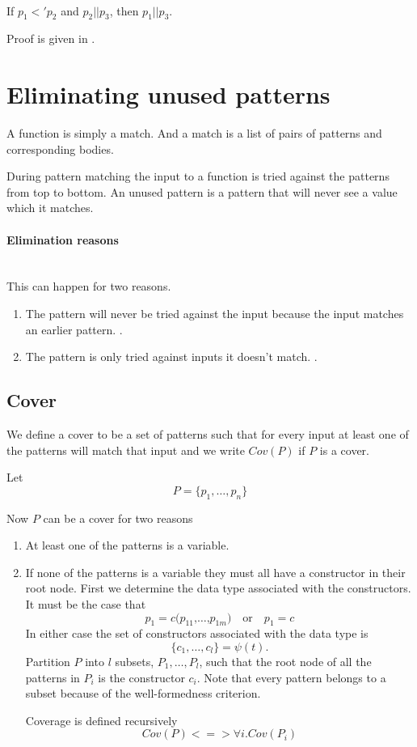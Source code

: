 \begin{lemma}[]\ \\
  \label{lem:more-specific-confused}
  If $p_1 <' p_2$ and $p_2 || p_3$, then $p_1 || p_3$.

  Proof is given in .
\end{lemma}


\section{Eliminating unused patterns}
A function is simply a match. And a match is a list of pairs of patterns and
corresponding bodies.

During pattern matching the input to a function is tried against the patterns
from top to bottom. An unused pattern is a pattern that will never see a value
which it matches.

\paragraph{Elimination reasons}\ \\
This can happen for two reasons.
\begin{enumerate}
\item The pattern will never be tried against the input because the input
  matches an earlier pattern. \label{item:unused-reason-1}.
\item The pattern is only tried against inputs it doesn't
  match. \label{item:unused-reason-2}.
\end{enumerate}

\subsection{Cover}
\label{sec:cover}
We define a cover to be a set of patterns such that for every input at least one
of the patterns will match that input and we write $Cov(P)$ if $P$ is a cover.

Let
\[
P = \{p_1,\ldots,p_n\}
\]

Now $P$ can be a cover for two reasons

\begin{enumerate}
\item At least one of the patterns is a variable.
\item If none of the patterns is a variable they must all have a constructor in
  their root node. First we determine the data type associated with the
  constructors. It must be the case that
  \[
  p_1 = c \texttt{(} p_{11} \texttt{,} \ldots \texttt{,} p_{1m}\texttt{)}
  \quad \textrm{or} \quad
  p_1 = c
  \]
  In either case the set of constructors associated with the data type is
  \[
  \{c_1, \ldots, c_l\} = \psi(t).
  \]
  Partition $P$ into $l$ subsets, $P_1, \ldots, P_l$, such that the root node of
  all the patterns in $P_i$ is the constructor $c_i$. Note that every pattern
  belongs to a subset because of the well-formedness criterion.

  Coverage is defined recursively
  \[
  Cov(P) <=> \forall i. Cov(P_i)
  \]
\end{enumerate}

